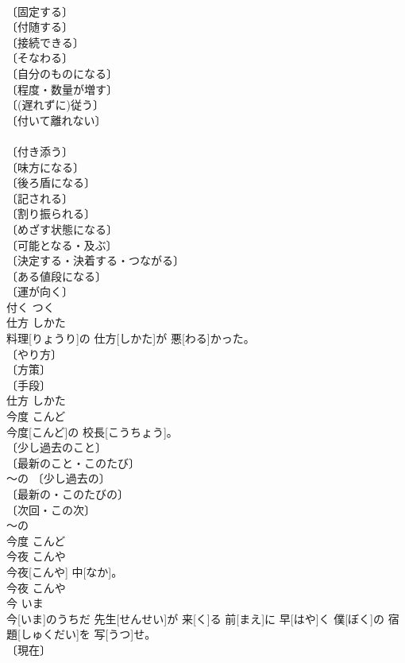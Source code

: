 \documentclass[8pt]{extreport}
\begin{document}
\begin{CJK}{UTF8}{min}
\\	〔固定する〕 
\\	〔付随する〕 
\\	〔接続できる〕 
\\	〔そなわる〕 
\\	〔自分のものになる〕 
\\	〔程度・数量が増す〕 
\\	〔(遅れずに)従う〕 
\\	〔付いて離れない〕 
\\	[⇒ついていく] 
\\	〔付き添う〕 
\\	〔味方になる〕 
\\	〔後ろ盾になる〕 
\\	〔記される〕 
\\	〔割り振られる〕 
\\	〔めざす状態になる〕 
\\	〔可能となる・及ぶ〕 
\\	〔決定する・決着する・つながる〕 
\\	〔ある値段になる〕 
\\	〔運が向く〕 
\\	[⇒ついて(い)る]	付く	つく	
\\	仕方	しかた	
\\	料理[りょうり]の 仕方[しかた]が 悪[わる]かった。	
\\	〔やり方〕 
\\	〔方策〕 
\\	〔手段〕 
\\	仕方	しかた	
\\	今度	こんど	
\\	今度[こんど]の 校長[こうちょう]。	
\\	〔少し過去のこと〕 
\\	〔最新のこと・このたび〕 
\\	～の 〔少し過去の〕 
\\	〔最新の・このたびの〕 
\\	〔次回・この次〕 
\\	～の 
\\	今度	こんど	
\\	今夜	こんや	
\\	今夜[こんや] 中[なか]。	
\\	[＝こんばん]	今夜	こんや	
\\	今	いま	
\\	今[いま]のうちだ 先生[せんせい]が 来[く]る 前[まえ]に 早[はや]く 僕[ぼく]の 宿題[しゅくだい]を 写[うつ]せ。	
\\	〔現在〕 

\end{CJK}
\end{document}
